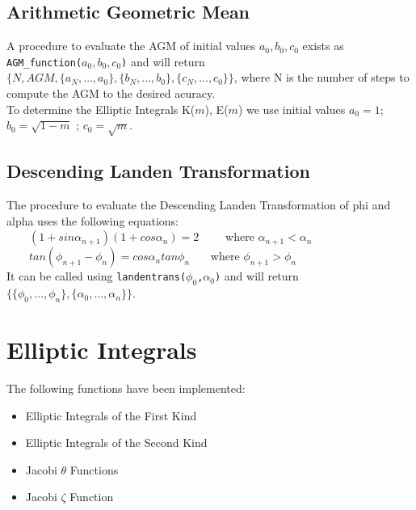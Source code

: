 \subsection{Arithmetic Geometric Mean}

A procedure to evaluate the AGM of initial values \(a_0,b_0,c_0\)
exists as \\
{\tt AGM\_function(\(a_0,b_0,c_0\))} and will return \\
$\{ N, AGM, \{ a_N, \ldots ,a_0\}, \{ b_N, \ldots ,b_0\},
\{c_N, \ldots ,c_0\}\}$,
where N is the number of steps to compute the AGM to the
desired acuracy. \\

To determine the Elliptic Integrals K($m$), E($m$) we use initial values
\(a_0 = 1\); \(b_0 = \sqrt{1-m}\) ; \(c_0 = \sqrt{m}\).


\subsection{Descending Landen Transformation}

The procedure to evaluate the Descending Landen Transformation of
phi and alpha uses the following equations:\\
\indent \ \ \ \ \( (1+sin \alpha_{n+1})(1+cos \alpha_n)=2 \)
\ \ \ \ where \(\alpha_{n+1}<\alpha_n\) \\
\indent \ \ \ \ \(tan(\phi_{n+1}-\phi_n)=cos \alpha_n tan \phi_n \)
\ \ \ where \(\phi_{n+1}>\phi_n\) \\

It can be called using {\tt landentrans($\phi_0$,$\alpha_0$)}
and will return \\
$\{\{\phi_0, \ldots ,\phi_n\},\{\alpha_0, \ldots ,\alpha_n\}\}$.

\section{Elliptic Integrals}
The following functions have been implemented:

\begin{itemize}
\item Elliptic Integrals of the First Kind
\item Elliptic Integrals of the Second Kind
\item Jacobi $\theta$ Functions
\item Jacobi $\zeta$ Function
\end{itemize}

